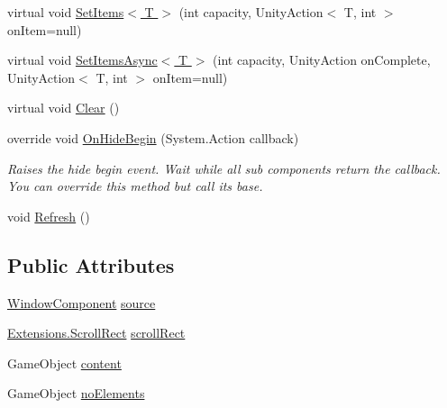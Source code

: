 \begin{DoxyCompactItemize}
\item 
virtual void \hyperlink{class_unity_engine_1_1_u_i_1_1_windows_1_1_components_1_1_list_a222569f231b3f8d035d276a215b81ceb}{Set\+Items$<$ T $>$} (int capacity, Unity\+Action$<$ T, int $>$ on\+Item=null)
\item 
virtual void \hyperlink{class_unity_engine_1_1_u_i_1_1_windows_1_1_components_1_1_list_a4db763aa2b1cfdb4391d64710f34d530}{Set\+Items\+Async$<$ T $>$} (int capacity, Unity\+Action on\+Complete, Unity\+Action$<$ T, int $>$ on\+Item=null)
\item 
virtual void \hyperlink{class_unity_engine_1_1_u_i_1_1_windows_1_1_components_1_1_list_aee0e2014056a8eb9fd3b32b0bdc9d74f}{Clear} ()
\item 
override void \hyperlink{class_unity_engine_1_1_u_i_1_1_windows_1_1_components_1_1_list_a01005cc650377159aeb3ed105b7769c1}{On\+Hide\+Begin} (System.\+Action callback)
\begin{DoxyCompactList}\small\item\em Raises the hide begin event. Wait while all sub components return the callback. You can override this method but call it\textquotesingle{}s base. \end{DoxyCompactList}\item 
void \hyperlink{class_unity_engine_1_1_u_i_1_1_windows_1_1_components_1_1_list_a716234b7e483983d7f34fb4b276fb678}{Refresh} ()
\end{DoxyCompactItemize}
\subsection*{Public Attributes}
\begin{DoxyCompactItemize}
\item 
\hyperlink{class_unity_engine_1_1_u_i_1_1_windows_1_1_window_component}{Window\+Component} \hyperlink{class_unity_engine_1_1_u_i_1_1_windows_1_1_components_1_1_list_a0acb8436079981b08f09de21df87a1e9}{source}
\item 
\hyperlink{class_unity_engine_1_1_u_i_1_1_windows_1_1_extensions_1_1_scroll_rect}{Extensions.\+Scroll\+Rect} \hyperlink{class_unity_engine_1_1_u_i_1_1_windows_1_1_components_1_1_list_a45ce7be170ae2faf8057c3d459badd95}{scroll\+Rect}
\item 
Game\+Object \hyperlink{class_unity_engine_1_1_u_i_1_1_windows_1_1_components_1_1_list_a81f15cdef647cfffb1bb017742f1f353}{content}
\item 
Game\+Object \hyperlink{class_unity_engine_1_1_u_i_1_1_windows_1_1_components_1_1_list_a375bbc3a6fada2fa041b31d5abe2ca65}{no\+Elements}
\end{DoxyCompactItemize}


